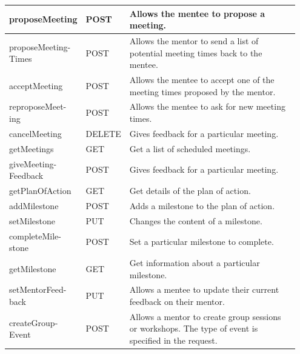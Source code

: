 \documentclass[10pt]{article}
\begin{document}
\begin{longtable}{|p{0.127\linewidth}|p{0.07\linewidth}|p{0.75\linewidth}|}
    proposeMeeting
    &
    POST
    &
    Allows the mentee to propose a meeting.
    \\ \hline

    proposeMeeting- Times
    &
    POST
    &
    Allows the mentor to send a list of potential meeting times back to the mentee.
    \\ \hline

    acceptMeeting
    &
    POST
    &
    Allows the mentee to accept one of the meeting times proposed by the mentor.
    \\ \hline

    reproposeMeet- ing
    &
    POST
    &
    Allows the mentee to ask for new meeting times.
    \\ \hline

    cancelMeeting
    &
    DELETE
    &
    Gives feedback for a particular meeting.
    \\ \hline

    getMeetings
    &
    GET
    &
    Get a list of scheduled meetings.
    \\ \hline

    giveMeeting- Feedback
    &
    POST
    &
    Gives feedback for a particular meeting.
    \\ \hline

    getPlanOfAction
    &
    GET
    &
    Get details of the plan of action.
    \\ \hline

    addMilestone
    &
    POST
    &
    Adds a milestone to the plan of action.
    \\ \hline

    setMilestone
    &
    PUT
    &
    Changes the content of a milestone.
    \\ \hline

    completeMile- stone
    &
    POST
    &
    Set a particular milestone to complete.
    \\ \hline

    getMilestone
    &
    GET
    &
    Get information about a particular milestone.
    \\ \hline

    setMentorFeed- back
    &
    PUT
    &
    Allows a mentee to update their current feedback on their mentor.
    \\ \hline

    createGroup- Event
    &
    POST
    &
    Allows a mentor to create group sessions or workshops. The type of event is specified in the request.
    \\ \hline


\end{longtable}
\end{document}
